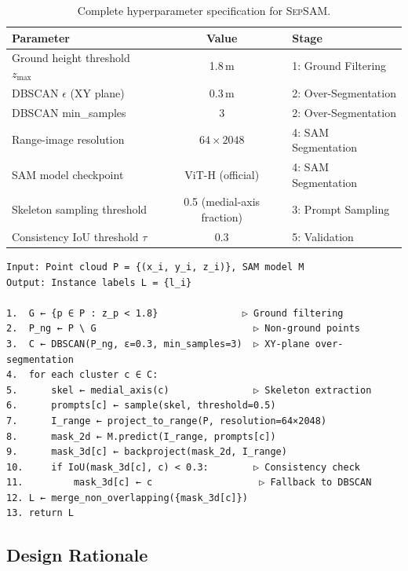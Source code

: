 \documentclass{article}
\begin{document}
\begin{table}[t]
\centering
\caption{Complete hyperparameter specification for \textsc{SepSAM}.}
\label{tab:hyperparams}
\begin{tabular}{lcl}
\toprule
Parameter & Value & Stage \\
\midrule
Ground height threshold $z_{\text{max}}$ & 1.8\,m & 1: Ground Filtering \\
DBSCAN $\epsilon$ (XY plane) & 0.3\,m & 2: Over-Segmentation \\
DBSCAN min\_samples & 3 & 2: Over-Segmentation \\
Range-image resolution & $64 \times 2048$ & 4: SAM Segmentation \\
SAM model checkpoint & ViT-H (official) & 4: SAM Segmentation \\
Skeleton sampling threshold & 0.5 (medial-axis fraction) & 3: Prompt Sampling \\
Consistency IoU threshold $\tau$ & 0.3 & 5: Validation \\
\bottomrule
\end{tabular}
\end{table}

\begin{algorithm}[t]
\caption{\textsc{SepSAM}: Zero-Training Geometric-SAM LiDAR Instance Segmentation}
\label{alg:pipeline}
\begin{verbatim}
Input: Point cloud P = {(x_i, y_i, z_i)}, SAM model M
Output: Instance labels L = {l_i}

1.  G ← {p ∈ P : z_p < 1.8}               ▷ Ground filtering
2.  P_ng ← P \ G                            ▷ Non-ground points
3.  C ← DBSCAN(P_ng, ε=0.3, min_samples=3)  ▷ XY-plane over-segmentation
4.  for each cluster c ∈ C:
5.      skel ← medial_axis(c)               ▷ Skeleton extraction
6.      prompts[c] ← sample(skel, threshold=0.5)
7.      I_range ← project_to_range(P, resolution=64×2048)
8.      mask_2d ← M.predict(I_range, prompts[c])
9.      mask_3d[c] ← backproject(mask_2d, I_range)
10.     if IoU(mask_3d[c], c) < 0.3:        ▷ Consistency check
11.         mask_3d[c] ← c                   ▷ Fallback to DBSCAN
12. L ← merge_non_overlapping({mask_3d[c]})
13. return L
\end{verbatim}
\end{algorithm}

\subsection{Design Rationale}
\end{document}
